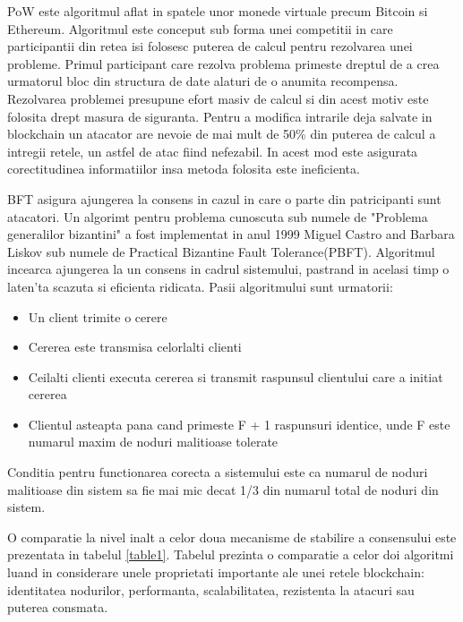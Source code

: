 \documentclass[12pt,a4paper,twoside]{report}
\begin{document}
		PoW este algoritmul aflat in spatele unor monede virtuale precum Bitcoin si Ethereum. Algoritmul este conceput sub forma unei competitii in care participantii din retea isi folosesc puterea de calcul pentru rezolvarea unei probleme. Primul participant care rezolva problema primeste dreptul de a crea urmatorul bloc din structura de date alaturi de o anumita recompensa. Rezolvarea problemei presupune efort masiv de calcul si din acest motiv este folosita drept masura de siguranta. Pentru a modifica intrarile deja salvate in blockchain un atacator are nevoie de mai mult de 50\% din puterea de calcul a intregii retele, un astfel de atac fiind nefezabil. In acest mod este asigurata corectitudinea informatiilor insa metoda folosita este ineficienta.
		
		BFT asigura ajungerea la consens in cazul in care o parte din patricipanti sunt atacatori. Un algorimt pentru problema  cunoscuta sub numele de "Problema generalilor bizantini" a fost implementat in anul 1999 Miguel Castro and Barbara Liskov sub numele de Practical Bizantine Fault Tolerance(PBFT). Algoritmul incearca ajungerea la un consens in cadrul sistemului, pastrand in acelasi timp o laten'ta scazuta si eficienta ridicata. Pasii algoritmului sunt urmatorii:
		\begin{itemize}
			\item Un client trimite o cerere 
			\item Cererea este transmisa celorlalti clienti
			\item Ceilalti clienti executa cererea si transmit raspunsul clientului care a initiat cererea
			\item Clientul asteapta pana cand primeste F + 1 raspunsuri identice, unde F este numarul maxim de noduri malitioase tolerate
			
		\end{itemize}
		Conditia pentru functionarea corecta a sistemului este ca numarul de noduri malitioase din sistem sa fie mai mic decat 1/3 din numarul total de noduri din sistem.
		
		O comparatie la nivel inalt a celor doua mecanisme de stabilire a consensului este prezentata in tabelul \ref{table1}. Tabelul prezinta o comparatie a celor doi algoritmi luand in considerare unele proprietati importante ale unei retele blockchain: identitatea nodurilor, performanta, scalabilitatea, rezistenta la atacuri sau puterea consmata.
	 
\end{document}
